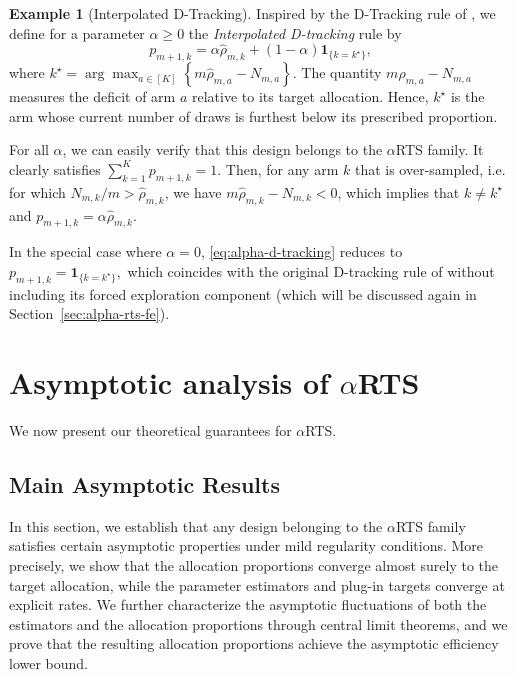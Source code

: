 \documentclass[11pt]{article}
\theoremstyle{plain}
\theoremstyle{definition}
\newtheorem{example}{Example}[section]
\begin{document}
	\begin{example}[Interpolated D-Tracking]
		Inspired by the D-Tracking rule of \cite{garivier2016optimal}, we define for a parameter $\alpha \geq 0$ the \textit{Interpolated D-tracking} rule by
		\begin{equation}\label{eq:alpha-d-tracking}
			p_{m+1,k}
			=
			\alpha \hat \rho_{m,k}
			+
			(1-\alpha)\mathbf 1_{\{k=k^\star\}},
		\end{equation}
		where \(k^\star
		=
		\arg\max_{a\in[K]}
		\left\{
		m\hat \rho_{m,a}-N_{m,a}
		\right\}
		\). The quantity $m\hat \rho_{m,a}-N_{m,a}$ measures the deficit of arm $a$
		relative to its target allocation. Hence, $k^\star$ is the arm whose
		current number of draws is furthest below its prescribed proportion.
		
		For all $\alpha$, we can easily verify that this design belongs to the $\alpha$RTS family. It clearly satisfies $\sum_{k=1}^{K} p_{m+1,k}=1$. Then, for any arm $k$ that is over-sampled, i.e. for which $N_{m,k}/m > \hat \rho_{m,k}$, we have $m\hat \rho_{m,k}-N_{m,k} < 0$, which implies that $k\neq k^\star$ and \(p_{m+1,k}
		=
		\alpha \hat \rho_{m,k}\).
		
		
		In the special case where $\alpha=0$, \eqref{eq:alpha-d-tracking} reduces to \(p_{m+1,k}
		=
		\mathbf 1_{\{k=k^\star\}},\)
		which coincides with the original D-tracking rule of
		\citet{garivier2016optimal} without including its forced exploration component (which will be discussed again in Section~\ref{sec:alpha-rts-fe}).
\end{example}

\section{Asymptotic analysis of $\alpha$RTS} \label{sec:proof_vanilla}

We now present our theoretical guarantees for $\alpha$RTS.

\subsection{Main Asymptotic Results}

In this section, we establish that any design belonging to the $\alpha$RTS family satisfies certain asymptotic properties under mild regularity conditions. More precisely, we show that the allocation proportions converge almost surely to the target allocation, while the parameter estimators and plug-in targets converge at explicit rates. We further characterize the asymptotic fluctuations of both the estimators and the allocation proportions through central limit theorems, and we prove that the resulting allocation proportions achieve the asymptotic efficiency lower bound.
\end{document}
